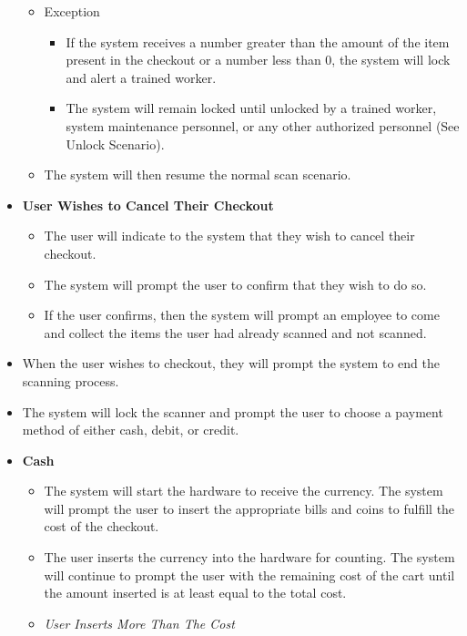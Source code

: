 \begin{itemize}
\begin{itemize}
        \item Exception
        \begin{itemize}
            \item If the system receives a number greater than the amount of 
            the item present in the checkout or a number less than 0, the 
            system will lock and alert a trained worker.
            \item The system will remain locked until unlocked by a trained 
            worker, system maintenance personnel, or any other authorized 
            personnel (See Unlock Scenario).
        \end{itemize}
        \item The system will then resume the normal scan scenario.
    \end{itemize}
    \item \textbf{User Wishes to Cancel Their Checkout}
    \begin{itemize}
        \item The user will indicate to the system that they wish to cancel 
        their checkout.
        \item The system will prompt the user to confirm that they wish 
        to do so.
        \item If the user confirms, then the system will prompt an employee 
        to come and collect the items the user had already scanned 
        and not scanned.
    \end{itemize}
    \item When the user wishes to checkout, they will prompt the system to 
    end the scanning process.
    \item The system will lock the scanner and prompt the user to choose a 
    payment method of either cash, debit, or credit.
    \item \textbf{Cash}
    \begin{itemize}
        \item The system will start the hardware to receive the currency. 
        The system will prompt the user to insert the appropriate bills and 
        coins to fulfill the cost of the checkout.
        \item The user inserts the currency into the hardware for counting. 
        The system will continue to prompt the user with the remaining cost 
        of the cart until the amount inserted is at least equal to the 
        total cost.
        \item {\it User Inserts More Than The Cost}
        \begin{itemize}

\end{itemize}
\end{itemize}
\end{itemize}

